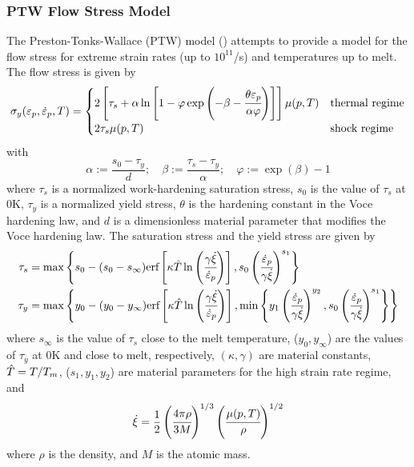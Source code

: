   \subsubsection{PTW Flow Stress Model}
  The Preston-Tonks-Wallace (PTW) model (\cite{Preston03}) attempts to
  provide a model for the flow stress for extreme strain rates
  (up to $10^{11}$/s) and temperatures up to melt.  The flow stress is
  given by
  \begin{equation}
    \sigma_y(\varepsilon_p,\dot{\varepsilon}_{p},T) = 
       \begin{cases}
         2\left[\tau_s + \alpha\ln\left[1 - \varphi
          \exp\left(-\beta-\cfrac{\theta\varepsilon_p}{\alpha\varphi}\right)\right]\right]
         \mu(p,T) & \text{thermal regime} \\
         2\tau_s\mu(p,T) & \text{shock regime}
       \end{cases}
  \end{equation}
  with
  \begin{equation}
    \alpha := \frac{s_0 - \tau_y}{d}; \quad
    \beta := \frac{\tau_s - \tau_y}{\alpha}; \quad
    \varphi := \exp(\beta) - 1
  \end{equation}
  where $\tau_s$ is a normalized work-hardening saturation stress,
  $s_0$ is the value of $\tau_s$ at 0K,
  $\tau_y$ is a normalized yield stress, $\theta$ is the hardening constant
  in the Voce hardening law, and $d$ is a dimensionless material
  parameter that modifies the Voce hardening law.  The saturation stress
  and the yield stress are given by
  \begin{align}
    \tau_s & = \max\left\{s_0 - (s_0 - s_{\infty})
       \text{erf}\left[\kappa
         \hat{T}\ln\left(\cfrac{\gamma\dot{\xi}}{\dot{\varepsilon}_{p}}\right)\right],
       s_0\left(\cfrac{\dot{\varepsilon}_{p}}{\gamma\dot{\xi}}\right)^{s_1}\right\} \\
    \tau_y & = \max\left\{y_0 - (y_0 - y_{\infty})
       \text{erf}\left[\kappa
         \hat{T}\ln\left(\cfrac{\gamma\dot{\xi}}{\dot{\varepsilon}_{p}}\right)\right],
       \min\left\{
         y_1\left(\cfrac{\dot{\varepsilon}_{p}}{\gamma\dot{\xi}}\right)^{y_2}, 
         s_0\left(\cfrac{\dot{\varepsilon}_{p}}{\gamma\dot{\xi}}\right)^{s_1}\right\}\right\} 
  \end{align}
  where $s_{\infty}$ is the value of $\tau_s$ close to the melt temperature,
  ($y_0, y_{\infty}$) are the values of $\tau_y$ at 0K and close to melt,
  respectively, $(\kappa, \gamma)$ are material constants, $\hat{T} = T/T_m$,
  ($s_1, y_1, y_2$) are material parameters for the high strain rate
  regime, and
  \begin{equation}
    \dot{\xi} = \frac{1}{2}\left(\cfrac{4\pi\rho}{3M}\right)^{1/3}
             \left(\cfrac{\mu(p,T)}{\rho}\right)^{1/2}
  \end{equation}
  where $\rho$ is the density, and $M$ is the atomic mass.

